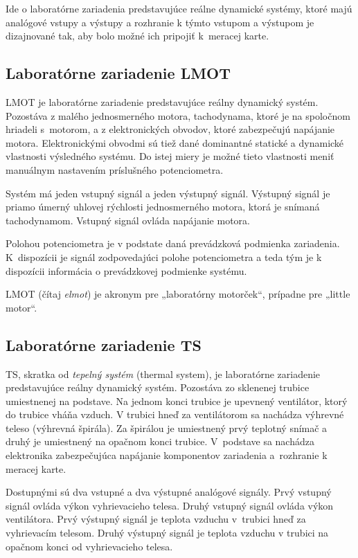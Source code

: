 \documentclass[a4paper, 10pt, ]{article}
\begin{document}
Ide o laboratórne zariadenia  predstavujúce reálne dynamické systémy, ktoré majú analógové vstupy a výstupy a rozhranie k týmto vstupom a výstupom je dizajnované tak, aby bolo možné ich pripojiť k~meracej karte.

\subsection{Laboratórne zariadenie LMOT}

LMOT je laboratórne zariadenie predstavujúce reálny dynamický systém. Pozostáva z malého jednosmerného motora, tachodynama, ktoré je na spoločnom hriadeli s~motorom, a z elektronických obvodov, ktoré zabezpečujú napájanie motora. Elektronickými obvodmi sú tiež dané dominantné statické a dynamické vlastnosti výsledného systému. Do istej miery je možné tieto vlastnosti meniť manuálnym nastavením príslušného potenciometra.

Systém má jeden vstupný signál a jeden výstupný signál. Výstupný signál je priamo úmerný uhlovej rýchlosti jednosmerného motora, ktorá je snímaná tachodynamom. Vstupný signál ovláda napájanie motora.

Polohou potenciometra je v podstate daná prevádzková podmienka zariadenia. K~dispozícii je signál zodpovedajúci polohe potenciometra a teda tým je k dispozícii informácia o prevádzkovej podmienke systému.

LMOT (čítaj \emph{elmot}) je akronym pre „laboratórny motorček“, prípadne pre „little motor“.




\subsection{Laboratórne zariadenie TS}

TS, skratka od \emph{tepelný systém} (thermal system), je laboratórne zariadenie predstavujúce reálny dynamický systém. Pozostáva zo sklenenej trubice umiestnenej na podstave. Na jednom konci trubice je upevnený ventilátor, ktorý do trubice vháňa vzduch. V trubici hneď za ventilátorom sa nachádza výhrevné teleso (výhrevná špirála). Za špirálou je umiestnený prvý teplotný snímač a druhý je umiestnený na opačnom konci trubice. V~podstave sa nachádza elektronika zabezpečujúca napájanie komponentov zariadenia a~rozhranie k meracej karte.

Dostupnými sú dva vstupné a dva výstupné analógové signály. Prvý vstupný signál ovláda výkon vyhrievacieho telesa. Druhý vstupný signál ovláda výkon ventilátora. Prvý výstupný signál je teplota vzduchu v~trubici hneď za vyhrievacím telesom. Druhý výstupný signál je teplota vzduchu v trubici na opačnom konci od vyhrievacieho telesa.
\end{document}
